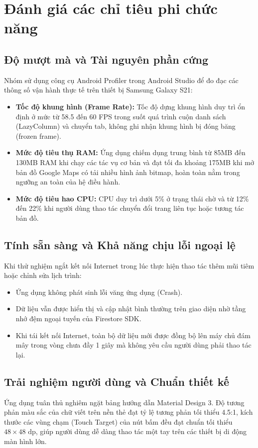 \section{Đánh giá các chỉ tiêu phi chức năng}
\label{sec:danh_gia_phi_chuc_nang}

\subsection{Độ mượt mà và Tài nguyên phần cứng}
Nhóm sử dụng công cụ Android Profiler trong Android Studio để đo đạc các thông số vận hành thực tế trên thiết bị Samsung Galaxy S21:
\begin{itemize}
    \item \textbf{Tốc độ khung hình (Frame Rate):} Tốc độ dựng khung hình duy trì ổn định ở mức từ 58.5 đến 60 FPS trong suốt quá trình cuộn danh sách (LazyColumn) và chuyển tab, không ghi nhận khung hình bị đóng băng (frozen frame).
    \item \textbf{Mức độ tiêu thụ RAM:} Ứng dụng chiếm dụng trung bình từ 85MB đến 130MB RAM khi chạy các tác vụ cơ bản và đạt tối đa khoảng 175MB khi mở bản đồ Google Maps có tải nhiều hình ảnh bitmap, hoàn toàn nằm trong ngưỡng an toàn của hệ điều hành.
    \item \textbf{Mức độ tiêu hao CPU:} CPU duy trì dưới 5\% ở trạng thái chờ và từ 12\% đến 22\% khi người dùng thao tác chuyển đổi trang liên tục hoặc tương tác bản đồ.
\end{itemize}

\subsection{Tính sẵn sàng và Khả năng chịu lỗi ngoại lệ}
Khi thử nghiệm ngắt kết nối Internet trong lúc thực hiện thao tác thêm mũi tiêm hoặc chỉnh sửa lịch trình:
\begin{itemize}
    \item Ứng dụng không phát sinh lỗi văng ứng dụng (Crash).
    \item Dữ liệu vẫn được hiển thị và cập nhật bình thường trên giao diện nhờ tầng nhớ đệm ngoại tuyến của Firestore SDK.
    \item Khi tái kết nối Internet, toàn bộ dữ liệu mới được đồng bộ lên máy chủ đám mây trong vòng chưa đầy 1 giây mà không yêu cầu người dùng phải thao tác lại.
\end{itemize}

\subsection{Trải nghiệm người dùng và Chuẩn thiết kế}
Ứng dụng tuân thủ nghiêm ngặt bảng hướng dẫn Material Design 3. Độ tương phản màu sắc của chữ viết trên nền thẻ đạt tỷ lệ tương phản tối thiểu 4.5:1, kích thước các vùng chạm (Touch Target) của nút bấm đều đạt chuẩn tối thiểu $48\times 48\text{ dp}$, giúp người dùng dễ dàng thao tác một tay trên các thiết bị di động màn hình lớn.
